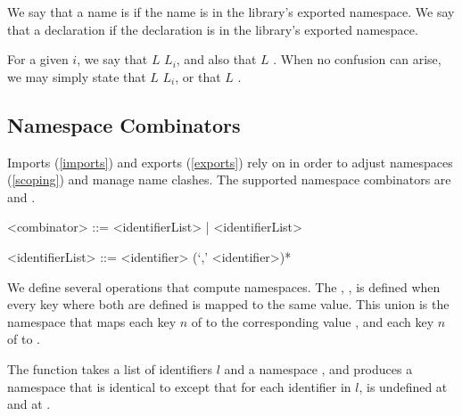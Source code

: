 \documentclass[makeidx]{article}
\begin{document}
{\LMHash{}%
We say that a name is 
if the name is in the library's exported namespace.
We say that a declaration 
if the declaration is in the library's exported namespace.

\LMHash{}%
For a given $i$,
we say that $L$
$L_i$, and also that $L$
.
When no confusion can arise, we may simply state
that $L$  $L_i$, or
that $L$  .


\subsection{Namespace Combinators}

\LMHash{}%
Imports (\ref{imports}) and exports (\ref{exports}) rely on
in order to adjust namespaces
(\ref{scoping})
and manage name clashes.
The supported namespace combinators are \SHOW{} and \HIDE.

\begin{grammar}
<combinator> ::= \SHOW{} <identifierList> | \HIDE{} <identifierList>

<identifierList> ::= <identifier> (`,' <identifier>)*
\end{grammar}

\LMHash{}%
We define several operations that compute namespaces.
The
,
,
is defined when every key where both are defined is mapped to the same value.
This union is the namespace that maps
each key $n$ of 
to the corresponding value ,
and each key $n$ of 
to .


\LMHash{}%
The function
takes a list of identifiers $l$ and a namespace ,
and produces a namespace  that is
identical to  except that for each identifier \id{} in $l$,
 is undefined at \id{} and at \code{\id=}.

}
\end{document}
